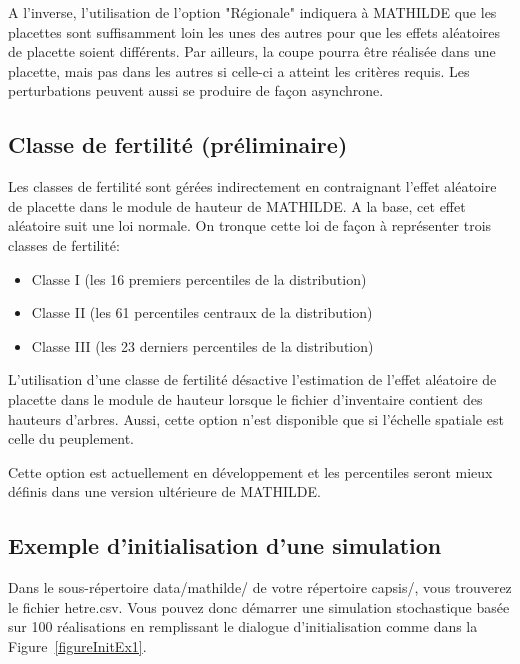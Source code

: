 \documentclass[a4paper,12pt]{article}
\begin{document}
A l'inverse, l'utilisation de l'option "Régionale" indiquera à MATHILDE que les placettes sont suffisamment loin les unes des autres pour que les effets aléatoires de placette soient différents. Par ailleurs, la coupe pourra être réalisée dans une placette, mais pas dans les autres si celle-ci a atteint les critères requis. Les perturbations peuvent aussi se produire de façon asynchrone.

\subsection{Classe de fertilité (préliminaire)}

Les classes de fertilité sont gérées indirectement en contraignant l'effet aléatoire de placette dans le module de hauteur de MATHILDE. A la base, cet effet aléatoire suit une loi normale. On tronque cette loi de façon à représenter trois classes de fertilité: 

\begin{itemize}
	\item Classe I (les 16 premiers percentiles de la distribution)
	\item Classe II (les 61 percentiles centraux de la distribution)
	\item Classe III (les 23 derniers percentiles de la distribution)
\end{itemize}

L'utilisation d'une classe de fertilité désactive l'estimation de l'effet aléatoire de placette dans le module de hauteur lorsque le fichier d'inventaire contient des hauteurs d'arbres. Aussi, cette option n'est disponible que si l'échelle spatiale est celle du peuplement.

Cette option est actuellement en développement et les percentiles seront mieux définis dans une version ultérieure de MATHILDE.

\subsection{Exemple d'initialisation d'une simulation}
\label{exempleInitialization}

Dans le sous-répertoire data/mathilde/ de votre répertoire capsis/, vous trouverez le fichier hetre.csv. Vous pouvez donc démarrer une simulation stochastique basée sur 100 réalisations en remplissant le dialogue d'initialisation comme dans la Figure~\ref{figureInitEx1}.
\end{document}
